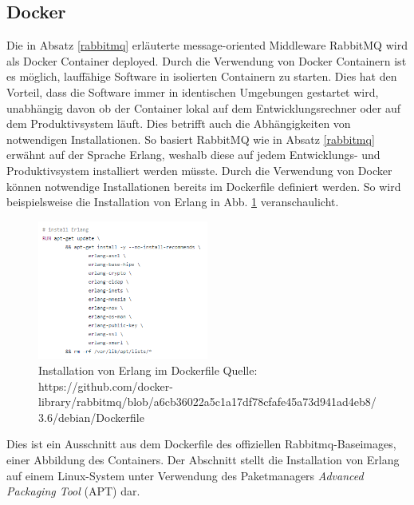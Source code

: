 \subsection{Docker}\label{Docker}
Die in Absatz \ref{rabbitmq} erläuterte message-oriented Middleware RabbitMQ wird als Docker Container deployed. Durch die Verwendung von Docker Containern ist es möglich, lauffähige Software in isolierten Containern zu starten. Dies hat den Vorteil, dass die Software immer in identischen Umgebungen gestartet wird, unabhängig davon ob der Container lokal auf dem Entwicklungsrechner oder auf dem Produktivsystem läuft. Dies betrifft auch die Abhängigkeiten von notwendigen Installationen. So basiert RabbitMQ wie in Absatz \ref{rabbitmq} erwähnt auf der Sprache Erlang, weshalb diese auf jedem Entwicklungs- und Produktivsystem installiert werden müsste. Durch die Verwendung von Docker können notwendige Installationen bereits im Dockerfile definiert werden. So wird beispielsweise die Installation von Erlang in Abb. \ref{img:erlangDockerfile} veranschaulicht. 

\begin{figure}[htbp]
	\centering
	\includegraphics[width=0.5\textwidth]{Bilder/erlangDockerfile.png}
	\caption{Installation von Erlang im Dockerfile Quelle: https://github.com/docker-library/rabbitmq/blob/a6cb36022a5c1a17df78cfafe45a73d941ad4eb8/3.6/\-debian/Dockerfile}
	\label{img:erlangDockerfile}
\end{figure}
Dies ist ein Ausschnitt aus dem Dockerfile des offiziellen Rabbitmq-Baseimages, einer Abbildung des Containers. Der Abschnitt stellt die Installation von Erlang auf einem Linux-System unter Verwendung des Paketmanagers \textit{Advanced Packaging Tool} (APT) dar.
